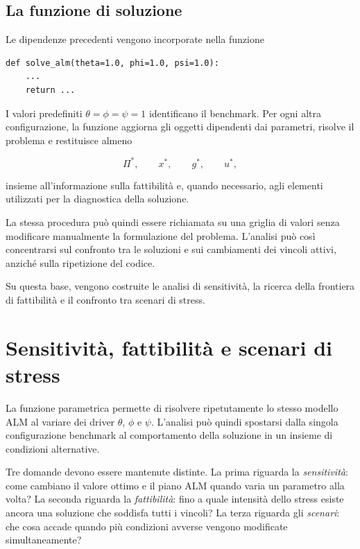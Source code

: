 \subsection{La funzione di soluzione}

Le dipendenze precedenti vengono incorporate nella funzione

\begin{verbatim}
def solve_alm(theta=1.0, phi=1.0, psi=1.0):
    ...
    return ...
\end{verbatim}

I valori predefiniti $\theta=\phi=\psi=1$ identificano il benchmark. Per ogni
altra configurazione, la funzione aggiorna gli oggetti dipendenti dai
parametri, risolve il problema e restituisce almeno

$$
\Pi^*,
\qquad
x^*,
\qquad
g^*,
\qquad
u^*,
$$

\noindent insieme all'informazione sulla fattibilit\`a e, quando necessario, agli
elementi utilizzati per la diagnostica della soluzione.

La stessa procedura pu\`o quindi essere richiamata su una griglia di valori
senza modificare manualmente la formulazione del problema. L'analisi pu\`o
cos\`i concentrarsi sul confronto tra le soluzioni e sui cambiamenti dei
vincoli attivi, anzich\'e sulla ripetizione del codice.

Su questa base, vengono costruite le analisi di sensitivit\`a, la ricerca
della frontiera di fattibilit\`a e il confronto tra scenari di stress.

\section{Sensitivit\`a, fattibilit\`a e scenari di stress}

La funzione parametrica permette di risolvere ripetutamente lo stesso modello
ALM al variare dei driver $\theta$, $\phi$ e $\psi$. L'analisi pu\`o quindi
spostarsi dalla singola configurazione benchmark al comportamento della
soluzione in un insieme di condizioni alternative.

Tre domande devono essere mantenute distinte. La prima riguarda la
\emph{sensitivit\`a}: come cambiano il valore ottimo e il piano ALM quando
varia un parametro alla volta? La seconda riguarda la
\emph{fattibilit\`a}: fino a quale intensit\`a dello stress esiste ancora una
soluzione che soddisfa tutti i vincoli? La terza riguarda gli
\emph{scenari}: che cosa accade quando pi\`u condizioni avverse vengono
modificate simultaneamente?

